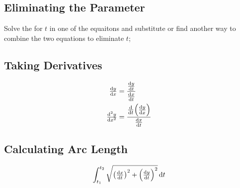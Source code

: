 \documentclass[12pt]{article}
\DeclarePairedDelimiter\paren{(}{)}
\newcommand*{\D}[1]{\mathop{}\!\mathrm{d}#1}
\newcommand*{\fixmath}{%
  \makebox{}\vspace{\glueexpr-\baselineskip-\abovedisplayskip}}
\newenvironment{fixaskip}{\setlength{\abovedisplayskip}{0pt}\fixmath%
  \ignorespaces}{\ignorespacesafterend}
\newenvironment{fixskip}{\setlength{\abovedisplayskip}{0pt}%
  \setlength{\belowdisplayskip}{0pt}\fixmath\ignorespaces}%
  {\ignorespacesafterend}
\begin{document}
\subsection*{Eliminating the Parameter}
Solve the for \(t\) in one of the equaitons and substitute or find another way
to combine the two equations to eliminate \(t\);
\subsection*{Taking Derivatives}
\begin{fixaskip}
  \begin{align*}
    \dd[y]{x} &= \frac{\dd[y]{t}}{\dd[x]{t}}\\
    \dd[2][y]{x} &= \frac{\dd{t}\paren*{\dd[y]{x}}}{\dd[x]{t}}
  \end{align*}
\end{fixaskip}
\subsection*{Calculating Arc Length}
\begin{fixskip}
  \[
    \int_{t_1}^{t_2}\sqrt{\paren*{\dd[x]{t}}^2 + \paren*{\dd[y]{t}}^2}\D{t}
  \]
\end{fixskip}
\end{document}
